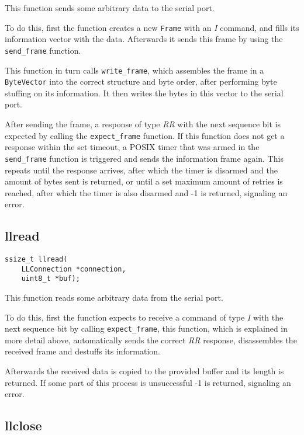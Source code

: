 \documentclass[11pt,a4paper,twocolumn]{article}
\begin{document}
This function sends some arbitrary data to the serial port.

To do this, first the function creates a new \lstinline{Frame} with an \textit{I} command, and fills its information vector with the data.
Afterwards it sends this frame by using the \lstinline{send_frame} function.

This function in turn calls \lstinline{write_frame}, which assembles the frame in a \lstinline{ByteVector} into the correct structure and byte order, after performing byte stuffing on its information.
It then writes the bytes in this vector to the serial port.

After sending the frame, a response of type \textit{RR} with the next sequence bit is expected by calling the \lstinline{expect_frame} function.
If this function does not get a response within the set timeout, a POSIX timer that was armed in the \lstinline{send_frame} function is triggered and sends the information frame again.
This repeats until the response arrives, after which the timer is disarmed and the amount of bytes sent is returned, or until a set maximum amount of retries is reached, after which the timer is also disarmed and -1 is returned, signaling an error.

\subsection{llread}

\begin{lstlisting}
ssize_t llread(
    LLConnection *connection, 
    uint8_t *buf);
\end{lstlisting}

This function reads some arbitrary data from the serial port.

To do this, first the function expects to receive a command of type \textit{I} with the next sequence bit by calling \lstinline{expect_frame}, this function, which is explained in more detail above, automatically sends the correct \textit{RR} response, disassembles the received frame and destuffs its information.

Afterwards the received data is copied to the provided buffer and its length is returned.
If some part of this process is unsuccessful -1 is returned, signaling an error.

\subsection{llclose}
\end{document}
